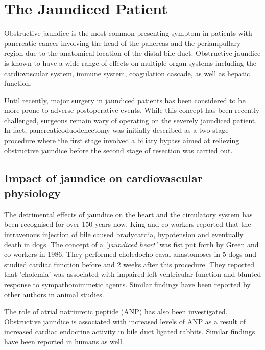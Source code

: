 \section{The Jaundiced Patient}

Obstructive jaundice is the most common presenting symptom in patients with pancreatic cancer involving the head of the pancreas and the periampullary region due to the anatomical location of the distal bile duct. Obstructive jaundice is known to have a wide range of effects on multiple organ systems including the cardiovascular system, immune system, coagulation cascade, as well as hepatic function.

Until recently, major surgery in jaundiced patients has been considered to be more prone to adverse postoperative events. While this concept has been recently challenged, surgeons remain wary of operating on the severely jaundiced patient. In fact, pancreaticoduodenectomy was initially described as a two-stage procedure where the first stage involved a biliary bypass aimed at relieving obstructive jaundice before the second stage of resection was carried out.


\subsection{Impact of jaundice on cardiovascular physiology}

The detrimental effects of jaundice on the heart and the circulatory system has been recognised for over 150 years now. King and co-workers reported that the intravenous injection of bile caused bradycardia, hypotension and eventually death in dogs.\parencite{king_effect_1909} The concept of a \textit{'jaundiced heart'} was fist put forth by Green and co-workers in 1986.\parencite{green_jaundiced_1986} They performed choledocho-caval anastomoses in 5 dogs and studied cardiac function before and 2 weeks after this procedure. They reported that 'cholemia' was associated with impaired left ventricular function and blunted response to sympathomimmetic agents. Similar findings have been reported by other authors in animal studies. \parencite{binah_obstructive_1985,bomzon_systemic_1986}

The role of atrial natriuretic peptide (ANP) has also been investigated. Obstructive jaundice is associated with increased levels of ANP as a result of increased cardiac endocrine activity in bile duct ligated rabbits.\parencite{pereira_increased_1994} Similar findings have been reported in humans as well. \parencite{gallardo_increased_1998, martinez-rodenas_circulating_1998}

